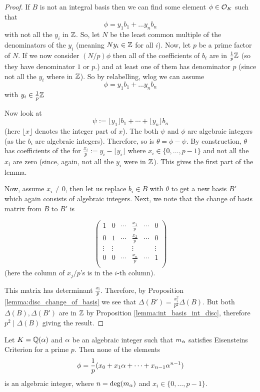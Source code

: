 \begin{proof}
	If $B$ is not an integral basis then we can find some element $\phi \in \mathcal{O}_K$ such that \[\phi=y_1b_1+\dots y_nb_n\] with not all the $y_i$ in $\mathbb{Z}$. So, let $N$ be the least common multiple of the denominators of the $y_i$ (meaning $Ny_i \in \mathbb{Z}$ for all $i$). Now, let $p$ be a prime factor of $N$. If we now consider $(N/p)\phi$ then all of the coefficients of $b_i$ are in $\frac{1}{p} \mathbb{Z}$ (so they have denominator $1$ or $p$.) and at least one of them has denominator $p$ (since not all the $y_i$ where in $\mathbb{Z}$). So by relabelling, wlog we can assume \[\phi=y_1b_1+\dots y_nb_n\] with $y_i \in  \frac{1}{p} \mathbb{Z}$

	Now look at \[\psi:=\lfloor y_1 \rfloor b_1+\cdots+\lfloor y_n \rfloor b_n\] (here $\lfloor x \rfloor$ denotes the integer part of $x$). The both $\psi$ and $\phi$ are algebraic integers (as the $b_i$ are algebraic integers). Therefore, so is $\theta=\phi-\psi$. By construction, $\theta$ has coefficients of the for $\frac{x_i}{p}:=y_i-\lfloor y_i \rfloor$ where $x_i \in \{0,\dots,p-1\}$ and not all the $x_i$ are zero (since, again, not all the $y_i$ were in $\mathbb{Z}$). This gives the first part of the lemma.

	Now, assume $x_i \neq 0$, then let us replace $b_i \in B$ with $\theta$ to get a new basis $B'$ which again consists of algebraic integers. Next, we note that the change of basis matrix from $B$ to $B'$ is

	\[ \left( \begin{matrix}
		1&0&\cdots& \frac{x_1}{p}& \cdots &0 \\
		0&1&\cdots& \frac{x_2}{p}& \cdots &0 \\
		\vdots& \vdots&&\vdots&&\vdots \\
		0&0&\cdots& \frac{x_n}{p}& \cdots &1 \\
	\end{matrix}                          \right) \](here the column of $x_j/p$'s is in the $i$-th column).

	This matrix has determinant $\frac{x_i}{p}.$ Therefore, by 	Proposition \ref{lemma:disc_change_of_basis} we see that $\Delta(B')=\frac{x_i^2}{p^2}\Delta(B)$. But both $\Delta(B),\Delta(B')$ are  in $\mathbb{Z}$ by Proposition \ref{lemma:int_basis_int_disc}, therefore $p^2 \mid \Delta(B)$ giving the result.
\end{proof}

\begin{lemma}\label{lemma:eis_crit_and_alg_ints}
	Let $K=\mathbb{Q}(\alpha)$ and $\alpha$ be an algebraic integer such that $m_\alpha$ satisfies Eisensteins Criterion for a prime $p$. Then none of the elements \[\phi=\frac{1}{p}(x_0+x_1\alpha+\cdots+x_{n-1}\alpha^{n-1})\] is an algebraic integer, where $n=\deg(m_\alpha)$ and $x_i \in \{0,\dots,p-1\}.$
\end{lemma}


